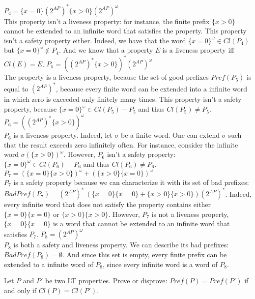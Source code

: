 \documentclass[11pt,a4paper]{article}
\newcommand\badp{\mathit{BadPref}}
\newcommand\pref{\mathit{Pref}}
\newcommand\twoap{2^{AP}}
\renewcommand\star{^*}
\newcommand\cl{\mathit{Cl}}
\begin{document}
\begin{Answer}
  \Question%
  $P_4 = \{x = 0\}(\twoap)\star\{x > 0\}(\twoap)^\omega$\\
This property isn't a liveness property: for instance, the finite prefix $\{x>0\}$ cannot be extended to an infinite word that satisfies the property.
This property isn't a safety property either. Indeed, we have that the word ${\{x=0\}}^\omega\in\cl(P_4)$ but ${\{x=0\}}^\omega\not\in P_4$. And we know that a property $E$ is a liveness property iff $\cl(E)=E$.
  \Question%
  $P_5 = ((\twoap)\star\{x > 0\})\star(\twoap)^\omega$\\  
The property is a liveness property, because the set of good prefixes $\pref(P_5)$ is equal to $(\twoap)\star$, because  every finite word can be extended into a infinite word in which zero is exceeded only finitely many times. This property isn't a safety property, because ${\{x=0\}}^\omega\in\cl(P_5)-P_5$ and thus $\cl(P_5)\neq P_5$.
  \Question%
  $P_6 = ((\twoap)\star\{x > 0\})^\omega$\\
$P_6$ is a liveness property. Indeed, let $\sigma$ be a finite word. One can extend $\sigma$ such that the result exceeds zero infinitely often. For instance, consider the infinite word ${\sigma(\{x>0\})}^\omega$.
However, $P_6$ isn't a safety property: ${\{x=0\}}^\omega\in\cl(P_6)-P_6$ and thus $\cl(P_6)\neq P_6$.
  \Question%
  $P_7 = (\{x = 0\}\{x > 0\})^\omega + (\{x > 0\}\{x = 0\})^\omega$\\
$P_7$ is a safety property because we can characterize it with its set of bad prefixes: $\badp(P_7)=(\twoap)\star\ (\{x=0\}\{x=0\} + \{x>0\}\{x>0\}) (\twoap)\star$. Indeed, every infinite word that does not satisfy the property contains either $\{x=0\}\{x=0\}$ or $\{x>0\}\{x>0\}$.
However, $P_7$ is not a liveness property, $\{x=0\}\{x=0\}$ is a word that cannot be extended to an infinite word that satisfies $P_7$.
  \Question%
  $P_8 = (\twoap)^\omega$\\
$P_8$ is both a safety and liveness property. We can describe its bad prefixes: $\badp(P_8)=\emptyset$. And since this set is empty, every finite prefix can be extended to a infinite word of $P_8$, since every infinite word is a word of $P_8$.
\end{Answer}

\begin{Exercise}

Let $P$ and $P'$ be two LT properties. Prove or disprove: $Pref(P) = Pref(P')$ if and only if $Cl(P) = Cl(P')$.
\end{Exercise}
\end{document}
